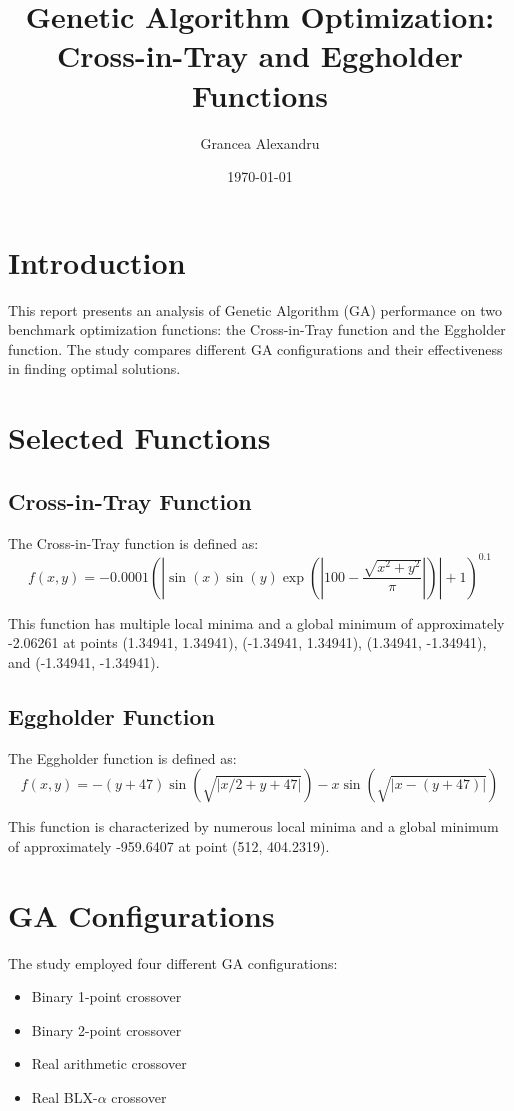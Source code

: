 \documentclass[12pt,a4paper]{article}
\title{Genetic Algorithm Optimization:\\
Cross-in-Tray and Eggholder Functions}
\author{Grancea Alexandru}
\date{\today}
\begin{document}
\maketitle

\section{Introduction}
This report presents an analysis of Genetic Algorithm (GA) performance on two benchmark optimization functions: the Cross-in-Tray function and the Eggholder function. The study compares different GA configurations and their effectiveness in finding optimal solutions.

\section{Selected Functions}

\subsection{Cross-in-Tray Function}
The Cross-in-Tray function is defined as:
\begin{equation}
f(x,y) = -0.0001 \left(|\sin(x)\sin(y)\exp(|100 - \frac{\sqrt{x^2 + y^2}}{\pi}|)| + 1\right)^{0.1}
\end{equation}

This function has multiple local minima and a global minimum of approximately -2.06261 at points (1.34941, 1.34941), (-1.34941, 1.34941), (1.34941, -1.34941), and (-1.34941, -1.34941).

\subsection{Eggholder Function}
The Eggholder function is defined as:
\begin{equation}
f(x,y) = -(y + 47)\sin(\sqrt{|x/2 + y + 47|}) - x\sin(\sqrt{|x - (y + 47)|})
\end{equation}

This function is characterized by numerous local minima and a global minimum of approximately -959.6407 at point (512, 404.2319).

\section{GA Configurations}
The study employed four different GA configurations:
\begin{itemize}
    \item Binary 1-point crossover
    \item Binary 2-point crossover
    \item Real arithmetic crossover
    \item Real BLX-$\alpha$ crossover
\end{itemize}
\end{document}
